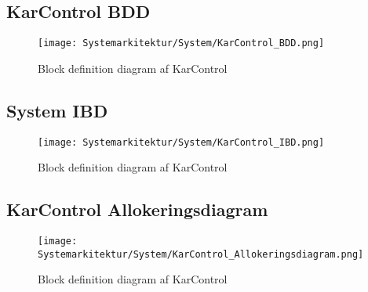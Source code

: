 
\subsection{KarControl BDD}

\begin{figure}[H]
	\centering
	\texttt{[image: Systemarkitektur/System/KarControl\_BDD.png]}
	\label{fig:KarControl BDD}
	\caption{Block definition diagram af KarControl}
\end{figure}



\subsection{System IBD}

\begin{figure}[H]
	\centering
	\texttt{[image: Systemarkitektur/System/KarControl\_IBD.png]}
	\label{fig:KarControl IBD}
	\caption{Block definition diagram af KarControl}
\end{figure}



\subsection{KarControl Allokeringsdiagram}

\begin{figure}[H]
	\centering
	\texttt{[image: Systemarkitektur/System/KarControl\_Allokeringsdiagram.png]}
	\label{fig:KarControl AD}
	\caption{Block definition diagram af KarControl}
\end{figure}
